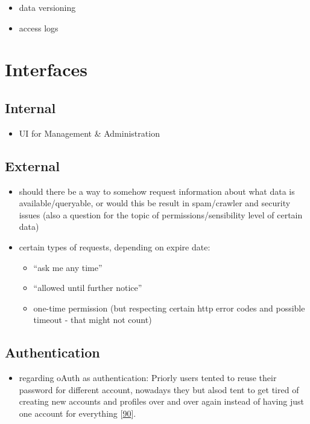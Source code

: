 \documentclass[12pt,english,a4paper,titlepage,cleardoublepage=empty,dottedtoc]{report}
\providecommand{\tightlist}{%
  \setlength{\itemsep}{0pt}\setlength{\parskip}{0pt}}
\begin{document}
\begin{itemize}
\tightlist
\item
  data versioning
\item
  access logs
\end{itemize}

\section{Interfaces}\label{interfaces}

\subsection{Internal}\label{internal}

\begin{itemize}
\tightlist
\item
  UI for Management \& Administration
\end{itemize}

\subsection{External}\label{external}

\begin{itemize}
\item
  should there be a way to somehow request information about what data
  is available/queryable, or would this be result in spam/crawler and
  security issues (also a question for the topic of
  permissions/sensibility level of certain data)
\item
  certain types of requests, depending on expire date:

  \begin{itemize}
  \tightlist
  \item
    ``ask me any time''
  \item
    ``allowed until further notice''
  \item
    one-time permission (but respecting certain http error codes and
    possible timeout - that might not count)
  \end{itemize}
\end{itemize}

\subsection{Authentication}\label{authentication}

\begin{itemize}
\tightlist
\item
  regarding oAuth as authentication: Priorly users tented to reuse their
  password for different account, nowadays they but alsod tent to get
  tired of creating new accounts and profiles over and over again
  instead of having just one account for everything
  {[}\protect\hyperlink{ref-web_2009-success-of-facebook-connect}{90}{]}.
\end{itemize}
\end{document}

